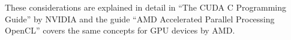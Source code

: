 These considerations are explained in detail in ``The CUDA C
Programming Guide'' by NVIDIA \cite{nvidia2010cudaguide} and the guide
``AMD Accelerated Parallel Processing OpenCL\texttrademark''
\cite{amd2011opencl} covers the same concepts for GPU devices by AMD.


